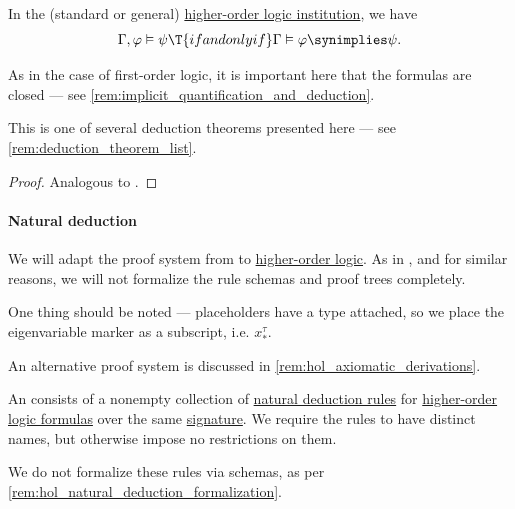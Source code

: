 \begin{theorem}\label{thm:hol_semantic_deduction_theorem}
  In the (standard or general) \hyperref[def:hol_institution]{higher-order logic institution}, we have
  \begin{equation*}
    \Gamma, \varphi \vDash \psi \T{if and only if} \Gamma \vDash \varphi \synimplies \psi.
  \end{equation*}
\end{theorem}
\begin{comments}
  \item As in the case of first-order logic, it is important here that the formulas are closed --- see \cref{rem:implicit_quantification_and_deduction}.

  \item This is one of several deduction theorems presented here --- see \cref{rem:deduction_theorem_list}.
\end{comments}
\begin{proof}
  Analogous to .
\end{proof}

\paragraph{Natural deduction}

\begin{remark}\label{rem:hol_natural_deduction_formalization}
  We will adapt the proof system from  to \hyperref[def:higher_order_logic]{higher-order logic}. As in , and for similar reasons, we will not formalize the rule schemas and proof trees completely.

  One thing should be noted --- placeholders have a type attached, so we place the eigenvariable marker as a subscript, i.e. \( x^\tau_* \).

  An alternative proof system is discussed in \cref{rem:hol_axiomatic_derivations}.
\end{remark}

\begin{definition}\label{def:hol_natural_deduction_system}\mimprovised
  An  consists of a nonempty collection of \hyperref[def:natural_deduction_rule]{natural deduction rules} for \hyperref[def:hol_expression]{higher-order logic formulas} over the same \hyperref[def:hol_signature]{signature}. We require the rules to have distinct names, but otherwise impose no restrictions on them.
\end{definition}
\begin{comments}
  \item We do not formalize these rules via schemas, as per \cref{rem:hol_natural_deduction_formalization}.
\end{comments}

